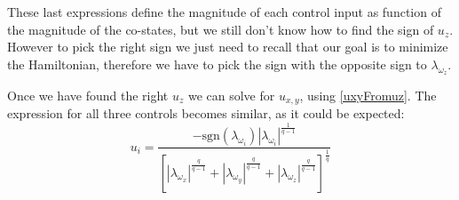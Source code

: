 These last expressions define the magnitude of each control input as function of the magnitude of the co-states, but we still don't know how to find the sign of $u_z$. However to pick the right sign we just need to recall that our goal is to minimize the Hamiltonian, therefore we have to pick the sign with the opposite sign to $\lambda_{\omega_z}$. 

Once we have found the right $u_z$ we can solve for $u_{x,y}$, using \ref{uxyFromuz}. The expression for all three controls becomes similar, as it could be expected:
\begin{equation}
\label{lqControl}
u_i = 
\frac{-\text{sgn}(\lambda_{\omega_{i}}) |\lambda_{\omega_{i}}|^{\frac{1}{q-1}}}
{\left[ |\lambda_{\omega_x}|^{\frac{q}{q-1}} + |\lambda_{\omega_y}|^{\frac{q}{q-1}} + |\lambda_{\omega_z}|^{\frac{q}{q-1}}\right]^\frac{1}{q}}
\end{equation}

